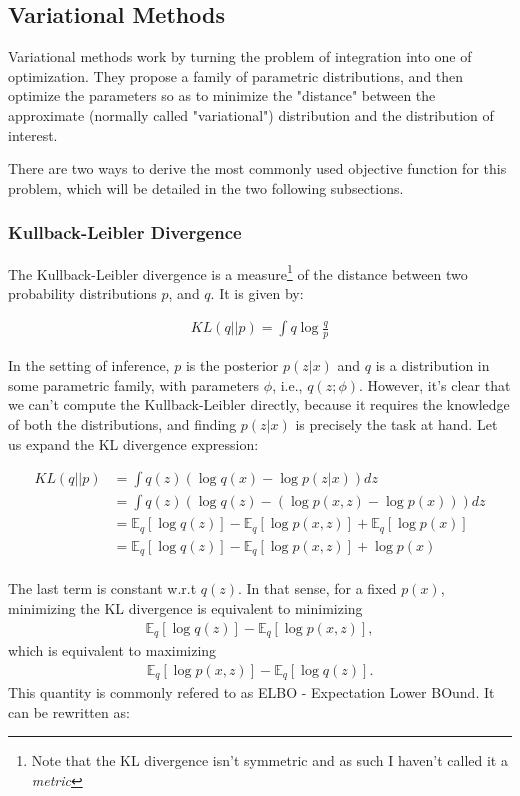 \subsection{Variational Methods}
\label{subsection:variational}
Variational methods work by turning the problem of integration into one of
optimization. They propose a family of parametric distributions, and then
optimize the parameters so as to minimize the "distance" between the approximate
(normally called "variational") distribution and the distribution of interest.

There are two ways to derive the most commonly used objective function for
this problem, which will be detailed in the two following subsections.

\subsubsection{Kullback-Leibler Divergence}
\label{subsubsection:kldiv}

The Kullback-Leibler divergence is a measure\footnote{Note that the KL divergence
isn't symmetric and as such I haven't called it a \emph{metric}} of the distance
between two probability distributions $p$, and $q$. It is given by:

\begin{align}
    KL(q||p) = \int q \log\frac{q}{p}
\end{align}

In the setting of inference, $p$ is the posterior $p(z|x)$ and $q$ is a distribution
in some parametric family, with parameters $\phi$, i.e., $q(z; \phi)$. However,
it's clear that we can't compute the Kullback-Leibler directly, because it
requires the knowledge of both the distributions, and finding $p(z|x)$ is precisely
the task at hand. Let us expand the KL divergence expression:

\begin{align}
    KL(q||p) &= \int q(z) (\log q(x) - \log p(z|x)) dz \\
             &= \int q(z) (\log q(z) - (\log p(x, z) - \log p(x))) dz \\
             &= \mathbb{E}_q [\log q(z)] - \mathbb{E}_q [\log p(x, z)] + \mathbb{E}_q [\log p(x)] \\
             &= \mathbb{E}_q [\log q(z)] - \mathbb{E}_q [\log p(x, z)] + \log p(x) \\
\end{align}

The last term is constant w.r.t $q(z)$. In that sense, for a fixed $p(x)$,
minimizing the KL divergence is equivalent to minimizing
\begin{align}
    \mathbb{E}_q [\log q(z)] - \mathbb{E}_q [\log p(x, z)],
\end{align} which is equivalent to maximizing
\begin{align}
    \mathbb{E}_q [\log p(x, z)] - \mathbb{E}_q [\log q(z)]. \label{eq:elbokldiv}
\end{align} This quantity is commonly refered to as ELBO - Expectation Lower BOund.
It can be rewritten as:

